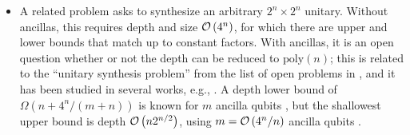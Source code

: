 \begin{refsection}
\begin{itemize}
    \item A related problem asks to synthesize an arbitrary $2^n \times 2^n$ unitary. Without ancillas, this requires depth and size $\mathcal{O}\left( 4^n \right)$, for which there are upper \cite{mottonen2005decompositions} and lower \cite{shende2004minimalTwoQubitCNOTCircuits} bounds that match up to constant factors. With ancillas, it is an open question whether or not the depth can be reduced to $\mathrm{poly}(n)$; this is related to the ``unitary synthesis problem'' from the list of open problems in \cite{aaronson2021openProblems}, and it has been studied in several works, e.g., \cite{sun2021asymptotically,rosenthal2021queryBoundsUnitaries,yuan2023optimalControlledStatePrep}. A depth lower bound of $\Omega(n + 4^n/(m+n))$ is known for $m$ ancilla qubits \cite{sun2021asymptotically}, but the shallowest upper bound is depth $\mathcal{O}\left( n2^{n/2} \right)$, using $m=\mathcal{O}\left( 4^n/n \right)$ ancilla qubits \cite{yuan2023optimalControlledStatePrep}. 

\end{itemize}

\printbibliography[heading=secbib,segment=\therefsegment]

\end{refsection}


\newpage 


